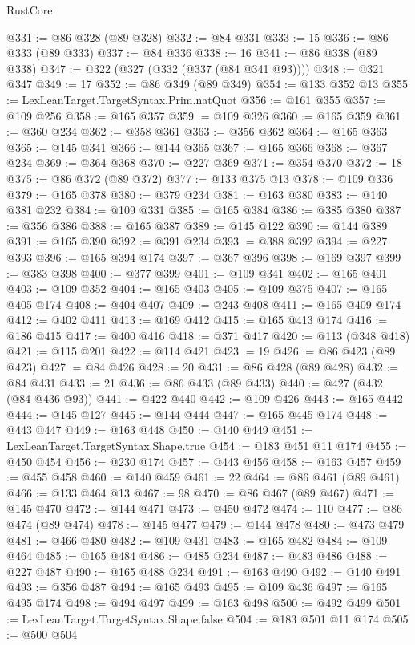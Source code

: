 \begin{lexlean}{RustCore}
\begin{coremodule}
@331 := @86 @328 (@89 @328)
@332 := @84 @331
@333 := 15
@336 := @86 @333 (@89 @333)
@337 := @84 @336
@338 := 16
@341 := @86 @338 (@89 @338)
@347 := @322 (@327 (@332 (@337 (@84 @341 @93))))
@348 := @321 @347
@349 := 17
@352 := @86 @349 (@89 @349)
@354 := @133 @352 @13
@355 := LexLeanTarget.TargetSyntax.Prim.natQuot
@356 := @161 @355
@357 := @109 @256
@358 := @165 @357
@359 := @109 @326
@360 := @165 @359
@361 := @360 @234
@362 := @358 @361
@363 := @356 @362
@364 := @165 @363
@365 := @145 @341
@366 := @144 @365
@367 := @165 @366
@368 := @367 @234
@369 := @364 @368
@370 := @227 @369
@371 := @354 @370
@372 := 18
@375 := @86 @372 (@89 @372)
@377 := @133 @375 @13
@378 := @109 @336
@379 := @165 @378
@380 := @379 @234
@381 := @163 @380
@383 := @140 @381 @232
@384 := @109 @331
@385 := @165 @384
@386 := @385 @380
@387 := @356 @386
@388 := @165 @387
@389 := @145 @122
@390 := @144 @389
@391 := @165 @390
@392 := @391 @234
@393 := @388 @392
@394 := @227 @393
@396 := @165 @394 @174
@397 := @367 @396
@398 := @169 @397
@399 := @383 @398
@400 := @377 @399
@401 := @109 @341
@402 := @165 @401
@403 := @109 @352
@404 := @165 @403
@405 := @109 @375
@407 := @165 @405 @174
@408 := @404 @407
@409 := @243 @408
@411 := @165 @409 @174
@412 := @402 @411
@413 := @169 @412
@415 := @165 @413 @174
@416 := @186 @415
@417 := @400 @416
@418 := @371 @417
@420 := @113 (@348 @418)
@421 := @115 @201
@422 := @114 @421
@423 := 19
@426 := @86 @423 (@89 @423)
@427 := @84 @426
@428 := 20
@431 := @86 @428 (@89 @428)
@432 := @84 @431
@433 := 21
@436 := @86 @433 (@89 @433)
@440 := @427 (@432 (@84 @436 @93))
@441 := @422 @440
@442 := @109 @426
@443 := @165 @442
@444 := @145 @127
@445 := @144 @444
@447 := @165 @445 @174
@448 := @443 @447
@449 := @163 @448
@450 := @140 @449
@451 := LexLeanTarget.TargetSyntax.Shape.true
@454 := @183 @451 @11 @174
@455 := @450 @454
@456 := @230 @174
@457 := @443 @456
@458 := @163 @457
@459 := @455 @458
@460 := @140 @459
@461 := 22
@464 := @86 @461 (@89 @461)
@466 := @133 @464 @13
@467 := 98
@470 := @86 @467 (@89 @467)
@471 := @145 @470
@472 := @144 @471
@473 := @450 @472
@474 := 110
@477 := @86 @474 (@89 @474)
@478 := @145 @477
@479 := @144 @478
@480 := @473 @479
@481 := @466 @480
@482 := @109 @431
@483 := @165 @482
@484 := @109 @464
@485 := @165 @484
@486 := @485 @234
@487 := @483 @486
@488 := @227 @487
@490 := @165 @488 @234
@491 := @163 @490
@492 := @140 @491
@493 := @356 @487
@494 := @165 @493
@495 := @109 @436
@497 := @165 @495 @174
@498 := @494 @497
@499 := @163 @498
@500 := @492 @499
@501 := LexLeanTarget.TargetSyntax.Shape.false
@504 := @183 @501 @11 @174
@505 := @500 @504

\end{coremodule}
\end{lexlean}
